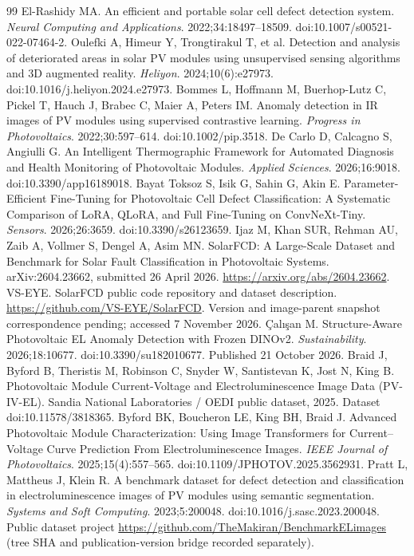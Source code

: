 \documentclass[10pt,a4paper]{article}
\begin{document}
\begin{thebibliography}{99}
 El-Rashidy MA. An efficient and portable solar cell defect detection system. \emph{Neural Computing and Applications}. 2022;34:18497--18509. doi:10.1007/s00521-022-07464-2.
 Oulefki A, Himeur Y, Trongtirakul T, et al. Detection and analysis of deteriorated areas in solar PV modules using unsupervised sensing algorithms and 3D augmented reality. \emph{Heliyon}. 2024;10(6):e27973. doi:10.1016/j.heliyon.2024.e27973.
 Bommes L, Hoffmann M, Buerhop-Lutz C, Pickel T, Hauch J, Brabec C, Maier A, Peters IM. Anomaly detection in IR images of PV modules using supervised contrastive learning. \emph{Progress in Photovoltaics}. 2022;30:597--614. doi:10.1002/pip.3518.
 De Carlo D, Calcagno S, Angiulli G. An Intelligent Thermographic Framework for Automated Diagnosis and Health Monitoring of Photovoltaic Modules. \emph{Applied Sciences}. 2026;16:9018. doi:10.3390/app16189018.
 Bayat Toksoz S, Isik G, Sahin G, Akin E. Parameter-Efficient Fine-Tuning for Photovoltaic Cell Defect Classification: A Systematic Comparison of LoRA, QLoRA, and Full Fine-Tuning on ConvNeXt-Tiny. \emph{Sensors}. 2026;26:3659. doi:10.3390/s26123659.
 Ijaz M, Khan SUR, Rehman AU, Zaib A, Vollmer S, Dengel A, Asim MN. SolarFCD: A Large-Scale Dataset and Benchmark for Solar Fault Classification in Photovoltaic Systems. arXiv:2604.23662, submitted 26 April 2026. \url{https://arxiv.org/abs/2604.23662}.
 VS-EYE. SolarFCD public code repository and dataset description. \url{https://github.com/VS-EYE/SolarFCD}. Version and image-parent snapshot correspondence pending; accessed 7 November 2026.
 \c{C}al{\i}\c{s}an M. Structure-Aware Photovoltaic EL Anomaly Detection with Frozen DINOv2. \emph{Sustainability}. 2026;18:10677. doi:10.3390/su182010677. Published 21 October 2026.
 Braid J, Byford B, Theristis M, Robinson C, Snyder W, Santistevan K, Jost N, King B. Photovoltaic Module Current-Voltage and Electroluminescence Image Data (PV-IV-EL). Sandia National Laboratories / OEDI public dataset, 2025. Dataset doi:10.11578/3818365.
 Byford BK, Boucheron LE, King BH, Braid J. Advanced Photovoltaic Module Characterization: Using Image Transformers for Current--Voltage Curve Prediction From Electroluminescence Images. \emph{IEEE Journal of Photovoltaics}. 2025;15(4):557--565. doi:10.1109/JPHOTOV.2025.3562931.
 Pratt L, Mattheus J, Klein R. A benchmark dataset for defect detection and classification in electroluminescence images of PV modules using semantic segmentation. \emph{Systems and Soft Computing}. 2023;5:200048. doi:10.1016/j.sasc.2023.200048. Public dataset project \url{https://github.com/TheMakiran/BenchmarkELimages} (tree SHA and publication-version bridge recorded separately).

\end{thebibliography}
\end{document}
